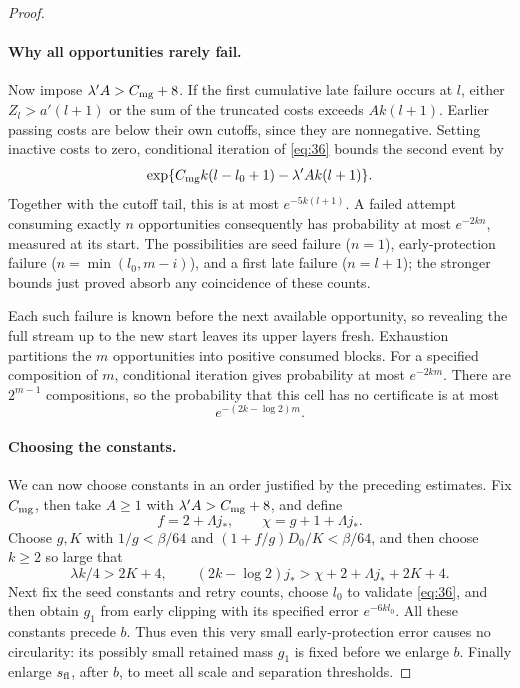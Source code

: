 \begin{proof}
\paragraph{Why all opportunities rarely fail.}
Now impose \(\lambda'A>C_{\rm mg}+8\). If the first cumulative
late failure occurs at \(l\), either \(Z_l>a'(l+1)\) or the
sum of the truncated costs exceeds \(Ak(l+1)\). Earlier passing
costs are below their own cutoffs, since they are nonnegative. Setting
inactive costs to zero, conditional iteration of \eqref{eq:36} bounds
the second event by
\[
 \exp\{C_{\rm mg}k(l-l_0+1)-\lambda'Ak(l+1)\}.
\]
Together with the cutoff tail, this is at most \(e^{-5k(l+1)}\).
A failed attempt consuming exactly \(n\) opportunities consequently
has probability at most \(e^{-2kn}\), measured at its start. The
possibilities are seed failure (\(n=1\)), early-protection failure
(\(n=\min(l_0,m-i)\)), and a first late failure (\(n=l+1\));
the stronger bounds just proved absorb any coincidence of these counts.

Each such failure is known before the next available opportunity, so
revealing the full stream up to the new start leaves its upper layers
fresh. Exhaustion partitions the \(m\) opportunities into positive
consumed blocks. For a specified composition of \(m\), conditional
iteration gives probability at most \(e^{-2km}\). There are
\(2^{m-1}\) compositions, so the probability that this cell has no
certificate is at most
\[
 e^{-(2k-\log2)m}.
\]

\paragraph{Choosing the constants.}
We can now choose constants in an order justified by the preceding
estimates. Fix \(C_{\rm mg}\), then take \(A\ge1\) with
\(\lambda'A>C_{\rm mg}+8\), and define
\[
 f=2+\Lambda j_*,\qquad \chi=g+1+\Lambda j_*.
\]
Choose \(g,K\) with
\(1/g<\beta/64\) and \((1+f/g)D_0/K<\beta/64\), and then choose
\(k\ge2\) so large that
\[
 \lambda k/4>2K+4,\qquad
 (2k-\log2)j_*>\chi+2+\Lambda j_*+2K+4.
 \tag{37}\label{eq:37}
\]
Next fix the seed constants and retry counts, choose \(l_0\) to
validate \eqref{eq:36}, and then obtain \(g_1\) from early clipping
with its specified error \(e^{-6kl_0}\). All these constants precede
\(b\). Thus even this very small early-protection error causes no
circularity: its possibly small retained mass \(g_1\) is fixed before
we enlarge \(b\). Finally enlarge \(s_{\rm fl}\), after \(b\), to
meet all scale and separation thresholds.


\end{proof}
